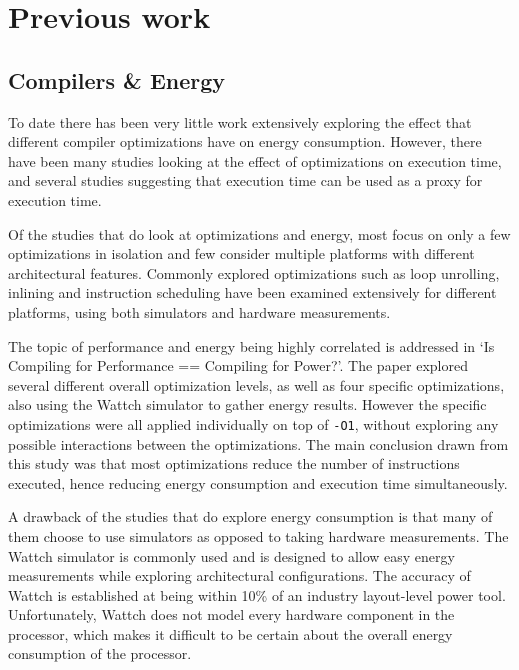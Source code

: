 \documentclass[twocolumn]{article}
\begin{document}
\section{Previous work}

\subsection{Compilers \& Energy}

To date there has been very little work extensively exploring the effect that different compiler optimizations have on energy consumption. However, there have been many studies looking at the effect of optimizations on execution time\cite{Haneda2005}, and several studies suggesting that execution time can be used as a proxy for execution time\cite{CompilingForPerformancePower}.

Of the studies that do look at optimizations and energy, most focus on only a few optimizations in isolation and few consider multiple platforms with different architectural features. Commonly explored optimizations such as loop unrolling, inlining and instruction scheduling have been examined extensively for different platforms, using both simulators and hardware measurements\cite{EffectOfCompilerOptimizationsOnPentium4}.

The topic of performance and energy being highly correlated is addressed in `Is Compiling for Performance == Compiling for Power?'\cite{CompilingForPerformancePower}. The paper explored several different overall optimization levels, as well as four specific optimizations, also using the Wattch simulator to gather energy results. However the specific optimizations were all applied individually on top of \texttt{-O1}, without exploring any possible interactions between the optimizations. The main conclusion drawn from this study was that most optimizations reduce the number of instructions executed, hence reducing energy consumption and execution time simultaneously.

A drawback of the studies that do explore energy consumption is that many of them choose to use simulators as opposed to taking hardware measurements. The Wattch simulator\cite{Wattch} is commonly used and is designed to allow easy energy measurements while exploring architectural configurations. The accuracy of Wattch is established at being within 10\% of an industry layout-level power tool. Unfortunately, Wattch does not model every hardware component in the processor, which makes it difficult to be certain about the overall energy consumption of the processor.
\end{document}
